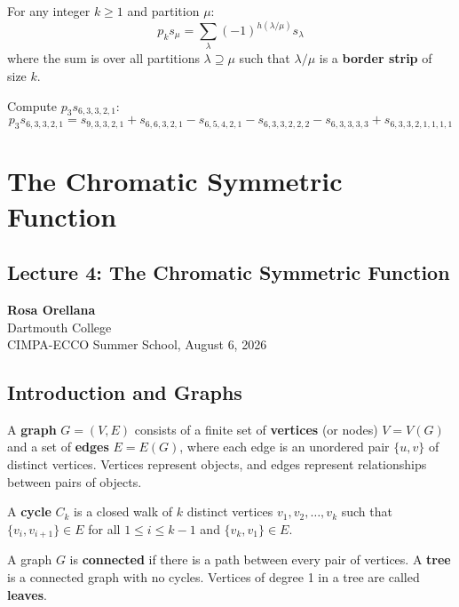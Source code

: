 \documentclass[12pt]{memoir}
\begin{document}
\begin{ptcb}
\begin{Th}
For any integer $k \ge 1$ and partition $\mu$:
\[
p_k s_\mu = \sum_{\lambda} (-1)^{h(\lambda / \mu)} s_\lambda
\]
where the sum is over all partitions $\lambda \supseteq \mu$ such that $\lambda / \mu$ is a \textbf{border strip} of size $k$.
\end{Th}
\end{ptcb}

\begin{Ex}
Compute $p_3 s_{6,3,3,2,1}$:
\[
p_3 s_{6,3,3,2,1} = s_{9,3,3,2,1} + s_{6,6,3,2,1} - s_{6,5,4,2,1} - s_{6,3,3,2,2,2} - s_{6,3,3,3,3} + s_{6,3,3,2,1,1,1,1}
\]
\end{Ex}

\chapter{The Chromatic Symmetric Function}

\section*{Lecture 4: The Chromatic Symmetric Function}
\begin{center}
\textbf{Rosa Orellana} \\
Dartmouth College \\
CIMPA-ECCO Summer School, August 6, 2026
\end{center}

\section{Introduction and Graphs}

\begin{ptcb}
\begin{Def}
A \textbf{graph} $G = (V, E)$ consists of a finite set of \textbf{vertices} (or nodes) $V = V(G)$ and a set of \textbf{edges} $E = E(G)$, where each edge is an unordered pair $\{u, v\}$ of distinct vertices. Vertices represent objects, and edges represent relationships between pairs of objects.
\end{Def}
\end{ptcb}

\begin{ptcb}
\begin{Def}
A \textbf{cycle} $C_k$ is a closed walk of $k$ distinct vertices $v_1, v_2, \dots, v_k$ such that $\{v_i, v_{i+1}\} \in E$ for all $1 \le i \le k-1$ and $\{v_k, v_1\} \in E$.

A graph $G$ is \textbf{connected} if there is a path between every pair of vertices. A \textbf{tree} is a connected graph with no cycles. Vertices of degree 1 in a tree are called \textbf{leaves}.
\end{Def}
\end{ptcb}
\end{document}
